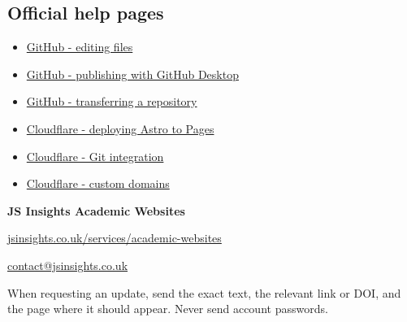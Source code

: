 \documentclass[10pt,a4paper]{article}
\begin{document}
\subsection{Official help pages}

\begin{itemize}
  \item \href{https://docs.github.com/en/repositories/working-with-files/managing-files/editing-files}{GitHub - editing files}
  \item \href{https://docs.github.com/en/desktop/overview/creating-your-first-repository-using-github-desktop}{GitHub - publishing with GitHub Desktop}
  \item \href{https://docs.github.com/en/repositories/creating-and-managing-repositories/transferring-a-repository}{GitHub - transferring a repository}
  \item \href{https://developers.cloudflare.com/pages/framework-guides/deploy-an-astro-site/}{Cloudflare - deploying Astro to Pages}
  \item \href{https://developers.cloudflare.com/pages/configuration/git-integration/}{Cloudflare - Git integration}
  \item \href{https://developers.cloudflare.com/pages/configuration/custom-domains/}{Cloudflare - custom domains}
\end{itemize}

\vfill
\begin{tcolorbox}[navy,left=7mm,right=7mm,top=6mm,bottom=6mm]
  {\Large\bfseries JS Insights Academic Websites}\par\vspace{1.5mm}
  \href{https://jsinsights.co.uk/services/academic-websites/}{jsinsights.co.uk/services/academic-websites}\par
  \href{mailto:contact@jsinsights.co.uk}{contact@jsinsights.co.uk}\par\vspace{3mm}
  When requesting an update, send the exact text, the relevant link or DOI, and the page where it should appear. Never send account passwords.
\end{tcolorbox}
\end{document}
